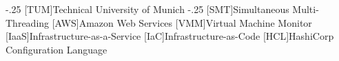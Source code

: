 \documentclass[headsepline,footsepline,footinclude=false,oneside,fontsize=11pt,paper=a4,listof=totoc,bibliography=totoc]{scrbook} %
\begin{document}


\frontmatter{}



%

\tableofcontents{}

\mainmatter{}

%








\appendix{}


\begin{acronym}
	\itemsep-.25\baselineskip
	[TUM]{Technical University of Munich}
	\itemsep-.25\baselineskip
	[SMT]{Simultaneous Multi-Threading}
	[AWS]{Amazon Web Services}
	[VMM]{Virtual Machine Monitor}
	[IaaS]{Infrastructure-as-a-Service}
	[IaC]{Infrastructure-as-Code}
	[HCL]{HashiCorp Configuration Language}
\end{acronym}

\printbibliography{}
\end{document}
